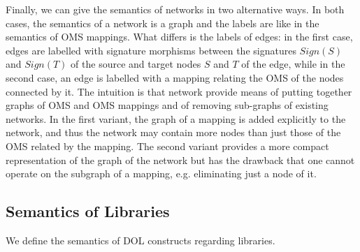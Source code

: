 \documentclass[10pt,fleqn,%
\ifpretendfinal
final%
\else
draft%
\fi,
]{scrreprt}
\newcommand*{\syntax}[1]{\texttt{#1}}
\newcommand{\semdom}[1]{
\begin{center}
\fbox{$#1$}
\end{center}
}
\newcommand{\ssclause}[1]{\subsection{#1}}
\begin{document}
Finally, we can give the semantics of networks in two alternative ways.
In both cases, the semantics of a network is a graph and the labels
are like in the semantics of OMS mappings. What differs is the labels of
edges: in the first case, edges are labelled with signature morphisms 
between the signatures 
$Sign(S)$ and $Sign(T)$ of the source and target nodes $S$ and $T$ of the
edge, while in the second case, an edge is labelled with a mapping
relating the OMS of the nodes connected by it. 
The intuition is that
network provide means of putting together graphs of OMS and OMS mappings
and of removing sub-graphs of existing networks. In the first 
variant, the graph of a mapping is added explicitly to the network, and
thus the network may contain more nodes than just those of the OMS
related by the mapping. The second variant provides a more compact
representation of the graph of the network but has the drawback that
one cannot operate on the subgraph of a mapping, e.g. eliminating just a 
node of it.


%


\ssclause{Semantics of Libraries}
We define the semantics of DOL constructs regarding libraries. 
\end{document}
